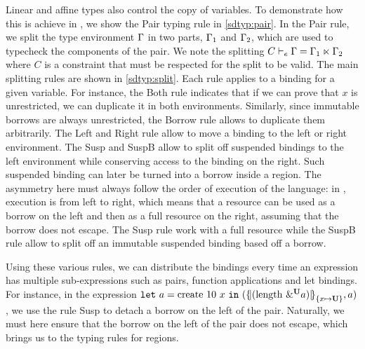 Linear and affine types also control the copy of variables.
To demonstrate how this is achieve in \lang, we show the
{\sc Pair} typing rule in \cref{sdtyp:pair}.
In the {\sc Pair} rule, we split the type environment $\E$ in two parts,
$\E_1$ and $\E_2$, which are used to typecheck the components of the pair.
We note the splitting $\lsplit{C}{\E}{\E_1}{\E_2}$ where $C$ is a constraint
that must be respected for the split to be valid.
The main splitting rules are shown in \cref{sdtyp:split}. Each
rule applies to a binding for a given variable. For instance, the
{\sc Both} rule indicates that if we can prove that $x$ is unrestricted, we
can duplicate it in both environments.
Similarly, since immutable borrows are always unrestricted, the
{\sc Borrow} rule allows to duplicate them arbitrarily.
The {\sc Left} and {\sc Right} rule allow to move a binding
to the left or right environment.
The {\sc Susp} and {\sc SuspB} allow to split off suspended bindings to
the left environment while conserving access to the binding on the right.
Such suspended binding can later be turned
into a borrow inside a region. The asymmetry here must always follow
the order of execution of the language: in \affe, execution is from left to
right, which means that a resource can be used as a borrow on the left
and then as a full resource on the right, assuming that the borrow does not
escape. The {\sc Susp} rule work with a full resource while the {\sc SuspB}
rule allow to split off an immutable suspended binding based off a borrow.

Using these various rules, we can distribute the bindings every time an
expression has multiple sub-expressions such as pairs, function applications
and let bindings. For instance, in the
expression
$\letin{a}{\text{create}\ 10\ x}
{\introPair{\region[{}]{\Sone x\IBORROW}{\app{\text{length}}{\borrow[\IBORROW]{a}}}}{a}}$,
we use the rule {\sc Susp} to detach a borrow on the left of the pair.
Naturally, we must here ensure that the borrow on the left of the pair does not
escape, which brings us to the typing rules for regions.

